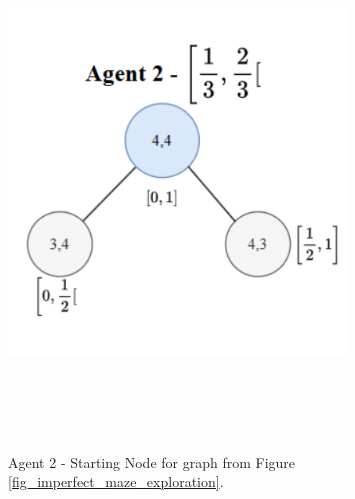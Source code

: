 \begin{figure}[H]
    \centering
    \includegraphics[width=0.8\textwidth]{ApeA/maze_agent_2_step_0.png}
    \caption{Agent 2 - Starting Node for graph from Figure \ref{fig_imperfect_maze_exploration}.}
    \label{fig_agent_2_step_0}
\end{figure}

